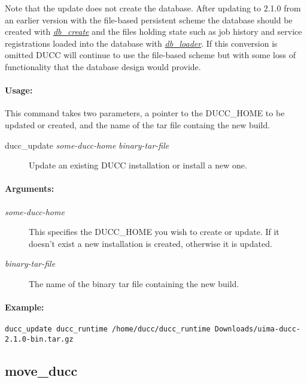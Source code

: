         Note that the update does not create the database.  After updating to 2.1.0 from an earlier
        version with the file-based persistent scheme the database should be created with
        \hyperref[subsec:admin.db-create]{\em db\_create} 
        and the files holding state such as job history and service registrations loaded into the database with
        \hyperref[subsec:admin.db-loader]{\em db\_loader}.
        If this conversion is omitted DUCC will continue to use the file-based scheme but with some
        loss of functionality that the database design would provide.
        
    \paragraph{Usage:}
        This command takes two parameters, a pointer to the DUCC\_HOME to be updated or created,
        and the name of the tar file containg the new build.
    \begin{description}
      \item[ducc\_update {\em some-ducc-home} {\em binary-tar-file}]
        Update an existing DUCC installation or install a new one.
    \end{description}

    \paragraph{Arguments:}
    \begin{description}
        \item[{\em some-ducc-home}] 
          This specifies the DUCC\_HOME you wish to create or update.  If it doesn't exist a new
          installation is created, otherwise it is updated.
        \item[{\em binary-tar-file}]
          The name of the binary tar file containing the new build.
     \end{description}

    \paragraph{Example:}
\begin{verbatim}
ducc_update ducc_runtime /home/ducc/ducc_runtime Downloads/uima-ducc-2.1.0-bin.tar.gz 
\end{verbatim}


\subsection{move\_ducc}
\label{subsec:admin.move-ducc}

